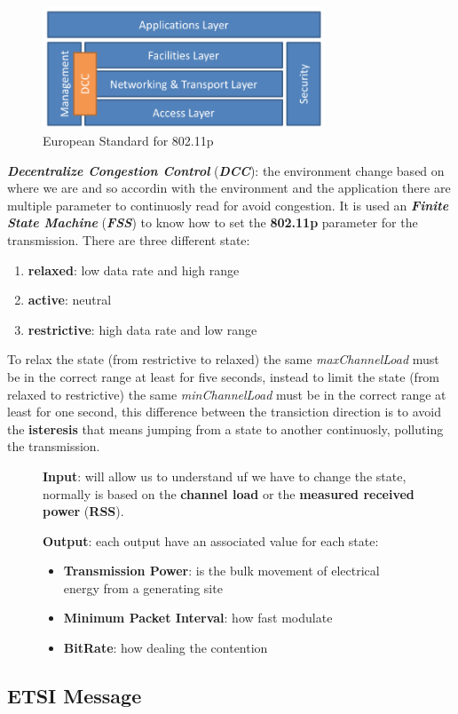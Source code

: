 \begin{figure}[h]
    \centering
    \includegraphics[width=0.75\textwidth]{img/etsi_11p}
    \caption{European Standard for 802.11p}
    \label{fig:etsi_11p}
\end{figure}
\textbf{\textit{Decentralize Congestion Control}} (\textbf{\textit{DCC}}): the environment change based on where we are and so accordin with the environment and the application there are multiple parameter to continuosly read for avoid congestion. It is used an \textbf{\textit{Finite State Machine}} (\textbf{\textit{FSS}}) to know how to set the \textbf{802.11p} parameter for the transmission.
There are three different state:
\begin{enumerate}[nosep]
    \item \textbf{relaxed}: low data rate and high range
    \item \textbf{active}: neutral
    \item \textbf{restrictive}: high data rate and low range
\end{enumerate}
To relax the state (from restrictive to relaxed) the same \textit{maxChannelLoad} must be in the correct range at least for five seconds, instead to limit the state (from relaxed to restrictive) the same \textit{minChannelLoad} must be in the correct range at least for one second, this difference between the transiction direction is to avoid the \textbf{isteresis} that means jumping from a state to another continuosly, polluting the transmission.

\begin{figure}[h]
    \centering
    \begin{minipage}[t]{0.45\textwidth}
        \centering
        \textbf{Input}: will allow us to understand uf we have to change the state, normally is based on the \textbf{channel load} or the \textbf{measured received power} (\textbf{RSS}).
    \end{minipage}
    \begin{minipage}[t]{0.45\textwidth}
        \centering
        \textbf{Output}: each output have an associated value for each state:
        \begin{itemize}[nosep]
            \item \textbf{Transmission Power}: is the bulk movement of electrical energy from a generating site
            \item \textbf{Minimum Packet Interval}: how fast modulate
            \item \textbf{BitRate}: how dealing the contention
        \end{itemize}
    \end{minipage}
\end{figure}

\subsection{ETSI Message}